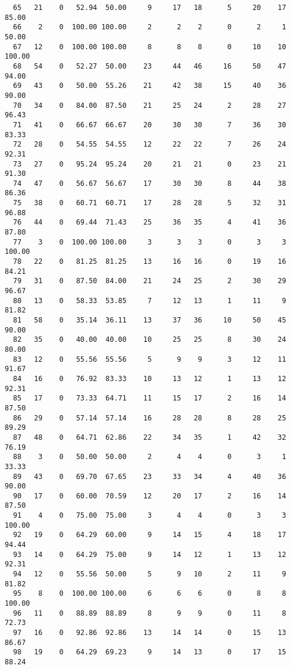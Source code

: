 \begin{verbatim}
  65   21    0   52.94  50.00     9     17   18      5     20    17    85.00
  66    2    0  100.00 100.00     2      2    2      0      2     1    50.00
  67   12    0  100.00 100.00     8      8    8      0     10    10   100.00
  68   54    0   52.27  50.00    23     44   46     16     50    47    94.00
  69   43    0   50.00  55.26    21     42   38     15     40    36    90.00
  70   34    0   84.00  87.50    21     25   24      2     28    27    96.43
  71   41    0   66.67  66.67    20     30   30      7     36    30    83.33
  72   28    0   54.55  54.55    12     22   22      7     26    24    92.31
  73   27    0   95.24  95.24    20     21   21      0     23    21    91.30
  74   47    0   56.67  56.67    17     30   30      8     44    38    86.36
  75   38    0   60.71  60.71    17     28   28      5     32    31    96.88
  76   44    0   69.44  71.43    25     36   35      4     41    36    87.80
  77    3    0  100.00 100.00     3      3    3      0      3     3   100.00
  78   22    0   81.25  81.25    13     16   16      0     19    16    84.21
  79   31    0   87.50  84.00    21     24   25      2     30    29    96.67
  80   13    0   58.33  53.85     7     12   13      1     11     9    81.82
  81   58    0   35.14  36.11    13     37   36     10     50    45    90.00
  82   35    0   40.00  40.00    10     25   25      8     30    24    80.00
  83   12    0   55.56  55.56     5      9    9      3     12    11    91.67
  84   16    0   76.92  83.33    10     13   12      1     13    12    92.31
  85   17    0   73.33  64.71    11     15   17      2     16    14    87.50
  86   29    0   57.14  57.14    16     28   28      8     28    25    89.29
  87   48    0   64.71  62.86    22     34   35      1     42    32    76.19
  88    3    0   50.00  50.00     2      4    4      0      3     1    33.33
  89   43    0   69.70  67.65    23     33   34      4     40    36    90.00
  90   17    0   60.00  70.59    12     20   17      2     16    14    87.50
  91    4    0   75.00  75.00     3      4    4      0      3     3   100.00
  92   19    0   64.29  60.00     9     14   15      4     18    17    94.44
  93   14    0   64.29  75.00     9     14   12      1     13    12    92.31
  94   12    0   55.56  50.00     5      9   10      2     11     9    81.82
  95    8    0  100.00 100.00     6      6    6      0      8     8   100.00
  96   11    0   88.89  88.89     8      9    9      0     11     8    72.73
  97   16    0   92.86  92.86    13     14   14      0     15    13    86.67
  98   19    0   64.29  69.23     9     14   13      0     17    15    88.24

\end{verbatim}

